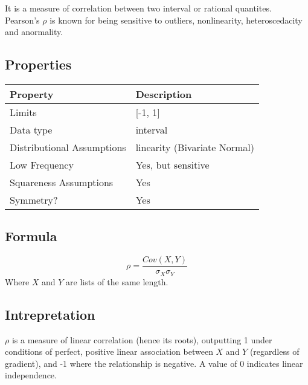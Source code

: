 \documentclass[11pt]{article}
\begin{document}
It is a measure of correlation between two interval or rational quantites.  Pearson's $\rho$ is known for being sensitive to outliers, nonlinearity, heteroscedacity and anormality.


\subsection{Properties}
\begin{tabular}{| l || l |}
    \hline
    {\bf Property} & {\bf Description} \\
    \hline
    Limits & [-1, 1] \\ \hline

    Data type & interval \\ \hline

    Distributional Assumptions & linearity (Bivariate Normal) \\ \hline

    Low Frequency & Yes, but sensitive \\ \hline

    Squareness Assumptions & Yes \\ \hline

    Symmetry? & Yes \\ \hline

\end{tabular}


\subsection{Formula}
$$
\rho = \frac{Cov(X,Y)}{\sigma_X \sigma_Y}
$$
Where $X$ and $Y$ are lists of the same length.

\subsection{Intrepretation}
$\rho$ is a measure of linear correlation (hence its roots), outputting 1 under conditions of perfect, positive linear association between $X$ and $Y$ (regardless of gradient), and -1 where the relationship is negative.  A value of 0 indicates linear independence.  
\end{document}
